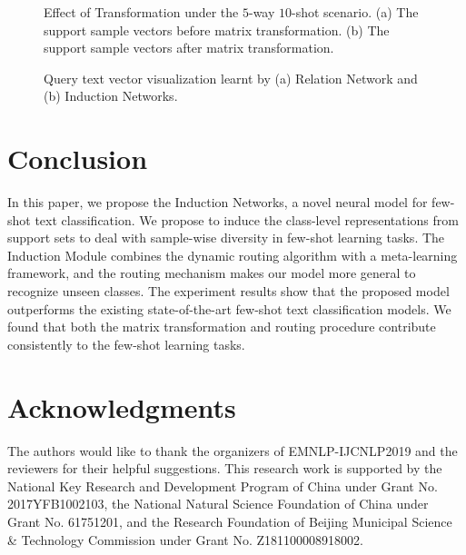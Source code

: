 \documentclass[11pt,a4paper]{article}
\begin{document}
\begin{figure}
    \centering
{}
\caption{Effect of Transformation under the $5$-way $10$-shot scenario. (a) The support sample vectors before matrix transformation. (b) The support sample vectors after matrix transformation.}
    \label{fig:transformation}
\end{figure}



\begin{figure}
    \centering
{}
\caption{Query text vector visualization learnt by (a) Relation Network and (b) Induction Networks.}
    \label{fig:sandian_cmp}
\end{figure}



\section{Conclusion}
In this paper, we propose the Induction Networks, a novel neural model for few-shot text classification. We propose to induce the class-level representations from support sets to deal with sample-wise diversity in few-shot learning tasks. The Induction Module combines the dynamic routing algorithm with a meta-learning framework, and the routing mechanism makes our model more general to recognize unseen classes.
The experiment results show that the proposed model outperforms the existing state-of-the-art few-shot text classification models. We found that both the matrix transformation and routing procedure contribute consistently to the few-shot learning tasks.
\section*{Acknowledgments}
The authors would like to thank the organizers of EMNLP-IJCNLP2019 and the reviewers for their helpful suggestions. This research work is supported by the National Key Research and Development Program of China under Grant No. 2017YFB1002103, the National Natural Science Foundation of China under Grant No. 61751201, and the Research Foundation of Beijing Municipal Science \& Technology Commission under Grant No. Z181100008918002.



\end{document}
